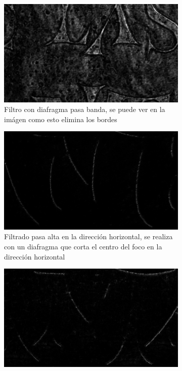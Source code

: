 \documentclass{./packages/optica-article}
\begin{document}
\begin{figure}[hptb]
\begin{center}
    \begin{subfigure}[t]{0.45\textwidth}\centering
    \includegraphics[width=\textwidth]{parte4-filtrado/4f-pic-2ocm-diafragm-10cm-camera-letters-diafragma_y_punto-pasabanda.png}
    \caption{Filtro con diafragma pasa banda, se puede ver en la imágen como esto elimina los bordes}
    \label{fig:filtrado1}
   \end{subfigure}
   \quad
	\begin{subfigure}[t]{0.45\textwidth}\centering
		\includegraphics[width=\textwidth]{parte4-filtrado/4f-pic-2ocm-diafragm-10cm-camera-letters-high-frequency-almost-x.png}
   	\caption{Filtrado pasa alta en la dirección horizontal, se realiza con un diafragma que corta el centro del foco en la dirección horizontal}
    \label{fig:filtrado2}
	\end{subfigure}
	\begin{subfigure}[t]{0.45\textwidth}\centering
		\includegraphics[width=\textwidth]{parte4-filtrado/4f-pic-2ocm-diafragm-10cm-camera-letters-high-frequency-dot-down.png}

\end{subfigure}
\end{center}
\end{figure}
\end{document}

